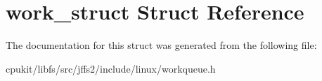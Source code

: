 \hypertarget{structwork__struct}{}\section{work\+\_\+struct Struct Reference}
\label{structwork__struct}


The documentation for this struct was generated from the following file\+:\begin{DoxyCompactItemize}
\item 
cpukit/libfs/src/jffs2/include/linux/workqueue.\+h\end{DoxyCompactItemize}
